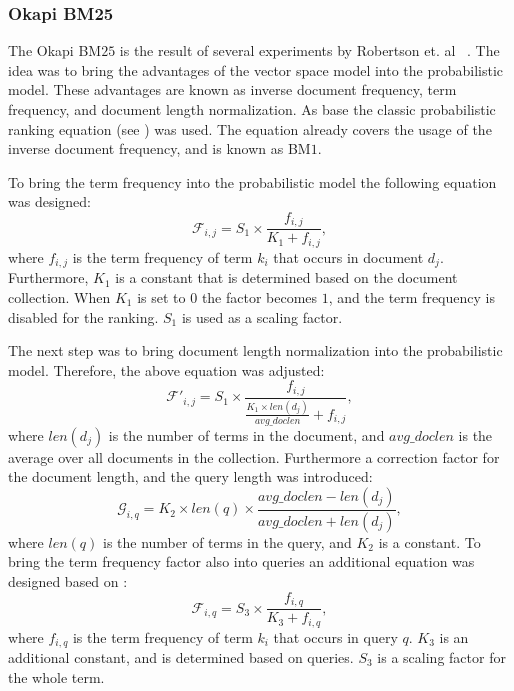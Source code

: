 \subsubsection{Okapi BM25}
\label{sec:okapi_bm25}

The Okapi BM$25$ is the result of several experiments by Robertson et. al ~\cite{RobertsonWHGL92, RobertsonWJHG93, RobertsonWJHG94}. The idea was to bring the advantages of the vector space model into the probabilistic model. These advantages are known as inverse document frequency, term frequency, and document length normalization. As base the classic probabilistic ranking equation (see ) was used. The equation already covers the usage of the inverse document frequency, and is known as BM$1$.

To bring the term frequency into the probabilistic model the following equation was designed:
\begin{equation}
  \label{bm25_term_frequency_factor}
  \mathcal{F}_{i, j} = S_1 \times \frac{f_{i,j}}{K_1 + f_{i, j}},
\end{equation}
where $f_{i, j}$ is the term frequency of term $k_i$ that occurs in document $d_j$. Furthermore, $K_1$ is a constant that is determined based on the document collection. When $K_1$ is set to $0$ the factor becomes $1$, and the term frequency is disabled for the ranking. $S_1$ is used as a scaling factor.   

The next step was to bring document length normalization into the probabilistic model. Therefore, the above equation was adjusted:
\begin{equation}
  \label{bm25_term_frequency_factor_extension}
  \mathcal{F}'_{i, j} = S_1 \times \frac{f_{i,j}}{\frac{K_1 \times len(d_j)}{avg\_doclen} + f_{i, j}},
\end{equation} 
where $len(d_j)$ is the number of terms in the document, and $avg\_doclen$ is the average over all documents in the collection. Furthermore a correction factor for the document length, and the query length was introduced:
\begin{equation}
  \mathcal{G}_{i, q} = K_2 \times len(q) \times \frac{avg\_doclen - len(d_j)}{avg\_doclen + len(d_j)},
\end{equation}
where $len(q)$ is the number of terms in the query, and $K_2$ is a constant. To bring the term frequency factor also into queries an additional equation was designed based on :
\begin{equation}
  \mathcal{F}_{i, q} = S_3 \times \frac{f_{i,q}}{K_3 + f_{i, q}},
\end{equation}
where $f_{i,q}$ is the term frequency of term $k_i$ that occurs in query $q$. $K_3$ is an additional constant, and is determined based on queries. $S_3$ is a scaling factor for the whole term.

